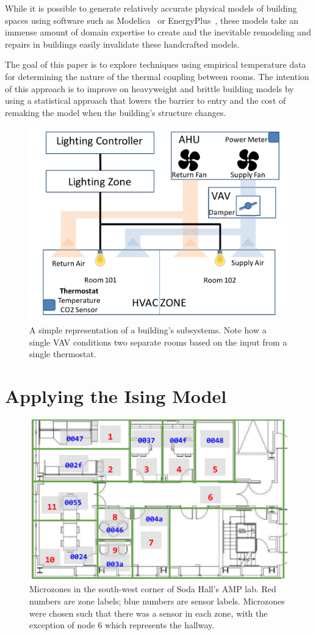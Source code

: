 While it is possible to generate relatively accurate physical models of building spaces using software such as Modelica~\cite{fritzson2010principles} or EnergyPlus~\cite{energyplus}, these models take an immense amount of domain expertise to create and the inevitable remodeling and repairs in buildings easily invalidate these handcrafted models.

The goal of this paper is to explore techniques using empirical temperature data for determining the nature of the thermal coupling between rooms.
The intention of this approach is to improve on heavyweight and brittle building models by using a statistical approach that lowers the barrier to entry and the cost of remaking the model when the building's structure changes.


\begin{figure}
\centering
\includegraphics[width=.5\linewidth]{figs/example_building}
\caption{A simple representation of a building's subsystems. Note how a single VAV conditions two separate rooms based on the input from a single thermostat.}
\label{fig:example_building}
\end{figure}

\section{Applying the Ising Model}

\begin{figure}
\centering
\includegraphics[width=.5\linewidth]{figs/Soda_AMP_microzones}
\caption{Microzones in the south-west corner of Soda Hall's AMP lab. Red numbers are zone labels; blue numbers are sensor labels. Microzones were chosen such that there was a sensor in each zone, with the exception of node 6 which represents the hallway.}
\label{fig:soda_amp_microzones}
\end{figure}

